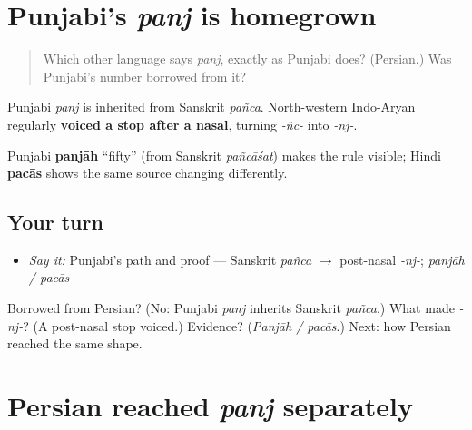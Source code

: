 \section[\texorpdfstring{(\pa{ਪੰਜ} · panj, continued)}{(ਪੰਜ · panj, continued)}]{Punjabi's \emph{panj} is homegrown}

\label{lesson:PA-C06-panj-convergence-homegrown}



\begin{quote}
Which other language says \emph{panj}, exactly as Punjabi does? (Persian.) Was Punjabi's number borrowed from it?
\end{quote}

\begin{cousinweb}
Punjabi \emph{panj} is inherited from Sanskrit \emph{pañca}. North-western Indo-Aryan regularly \textbf{voiced a stop after a nasal}, turning \emph{-ñc-} into \emph{-nj-}.

Punjabi \textbf{panjāh} “fifty” (from Sanskrit \emph{pañcāśat}) makes the rule visible; Hindi \textbf{pacās} shows the same source changing differently.
\end{cousinweb}

\subsection*{Your turn}
\begin{itemize}
\raggedright
  \item \emph{Say it:} Punjabi's path and proof — Sanskrit \emph{pañca} $\to$ post-nasal \emph{-nj-}; \emph{panjāh / pacās}
\end{itemize}

\begin{tcolorbox}[breakable,colback=teal!4,colframe=teal!35!black,title={Before you move on}]
Borrowed from Persian? (No: Punjabi \emph{panj} inherits Sanskrit \emph{pañca}.) What made \emph{-nj-}? (A post-nasal stop voiced.) Evidence? (\emph{Panjāh / pacās}.) Next: how Persian reached the same shape.
\end{tcolorbox}
\section[\texorpdfstring{(\pa{ਪੰਜ} · panj, the Persian path)}{(ਪੰਜ · panj, the Persian path)}]{Persian reached \emph{panj} separately}

\label{lesson:PA-C06-panj-convergence-homegrown-persian}



